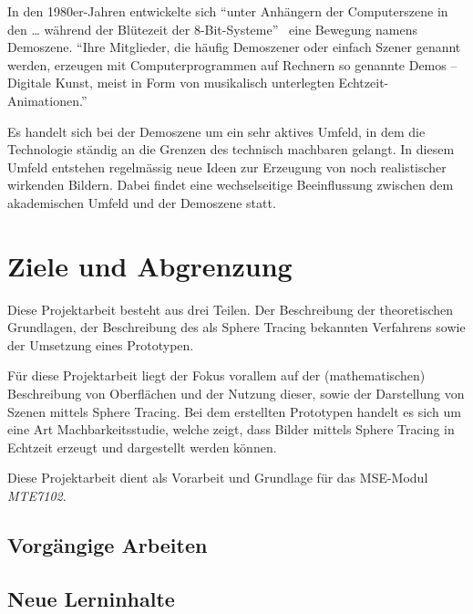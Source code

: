 In den 1980er-Jahren entwickelte sich ``unter Anhängern der
Computerszene in den \dots{} während der Blütezeit der
8-Bit-Systeme''~\cite{wikipedia_foundation_demoszene_2015} eine Bewegung
namens Demoszene. ``Ihre Mitglieder, die häufig Demoszener oder einfach
Szener genannt werden, erzeugen mit Computerprogrammen auf Rechnern so
genannte Demos – Digitale Kunst, meist in Form von musikalisch
unterlegten
Echtzeit-Animationen.''~\cite{wikipedia_foundation_demoszene_2015}

Es handelt sich bei der Demoszene um ein sehr aktives Umfeld, in dem die
Technologie ständig an die Grenzen des technisch machbaren gelangt. In
diesem Umfeld entstehen regelmässig neue Ideen zur Erzeugung von noch
realistischer wirkenden Bildern. Dabei findet eine wechselseitige
Beeinflussung zwischen dem akademischen Umfeld und der Demoszene statt.

\section{Ziele und Abgrenzung}
\label{sec:objectives}

Diese Projektarbeit besteht aus drei Teilen. Der Beschreibung der
theoretischen Grundlagen, der Beschreibung des als Sphere Tracing
bekannten Verfahrens sowie der Umsetzung eines Prototypen.

Für diese Projektarbeit liegt der Fokus vorallem auf der
(mathematischen) Beschreibung von Oberflächen und der Nutzung dieser,
sowie der Darstellung von Szenen mittels Sphere Tracing. Bei dem
erstellten Prototypen handelt es sich um eine Art Machbarkeitsstudie,
welche zeigt, dass Bilder mittels Sphere Tracing in Echtzeit erzeugt und
dargestellt werden können.

Diese Projektarbeit dient als Vorarbeit und Grundlage für das MSE-Modul
\textit{MTE7102}.

\subsection{Vorgängige Arbeiten}
\label{subsec:preliminaries}


\subsection{Neue Lerninhalte}
\label{subsec:new_learning_contents}


